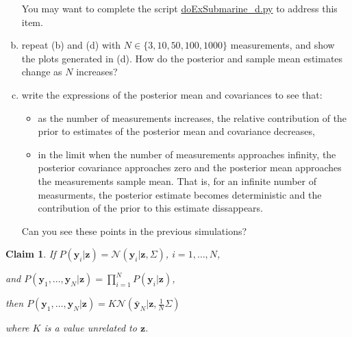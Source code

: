 \documentclass[12pt]{article}
\newtheorem{claim}{Claim}
\begin{document}
\begin{enumerate}[(a)]
        You may want to complete the script
        \href{http://github.com/joacorapela/gcnu\_bridging2023}{doExSubmarine\_d.py}
        to address this item.

    \item repeat (b) and (d) with $N\in\{3,10,50,100,1000\}$ measurements, and show
        the plots generated in (d).  How do the posterior and sample mean
        estimates change as $N$ increases?

    \item write the expressions of the posterior mean and covariances to
        see that:

        \begin{itemize}

            \item as the number of measurements increases, the relative
                contribution of the prior to estimates of the posterior
                mean and covariance decreases,

            \item in the limit when the number of measurements approaches
                infinity, the posterior covariance approaches zero and the
                posterior mean approaches the measurements sample mean.
                That is, for an infinite number of measurments, the
                posterior estimate becomes deterministic and the
                contribution of the prior to this estimate dissappears.

        \end{itemize}

        Can you see these points in the previous simulations?

\end{enumerate}

\pagebreak

\begin{claim}
    If
    $P(\mathbf{y}_i|\mathbf{z})=\mathcal{N}\left(\mathbf{y}_i|\mathbf{z},\Sigma\right)$,
    $i=1,\ldots,N$, 

    and
    $P(\mathbf{y}_1,\ldots,\mathbf{y}_N|\mathbf{z})=\prod_{i=1}^N
    P(\mathbf{y}_i|\mathbf{z})$, 

    then
    $P(\mathbf{y}_1,\ldots,\mathbf{y}_N|\mathbf{z})=K\mathcal{N}(\bar{\mathbf{y}}_N|\mathbf{z},\frac{1}{N}\Sigma)$

    where $K$ is a value unrelated to $\mathbf{z}$.
    \label{claim:likelihoodForZ}
\end{claim}
\end{document}
